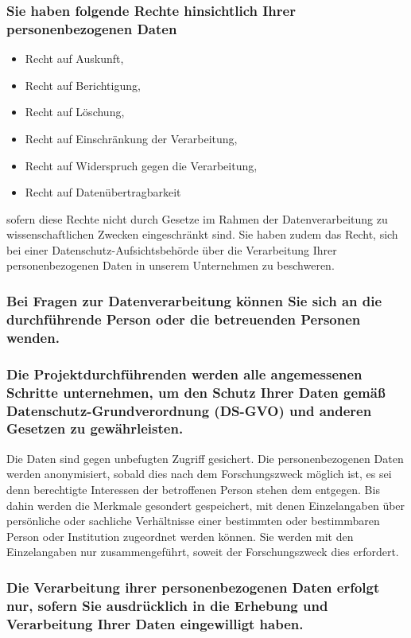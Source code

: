 \documentclass[11pt,a4paper]{article}
\begin{document}
\subsubsection{Sie haben folgende Rechte hinsichtlich Ihrer personenbezogenen Daten}

\begin{itemize}
\item Recht auf Auskunft,
\item Recht auf Berichtigung,
\item Recht auf Löschung,
\item Recht auf Einschränkung der Verarbeitung,
\item Recht auf Widerspruch gegen die Verarbeitung,
\item Recht auf Datenübertragbarkeit
\end{itemize}

sofern diese Rechte nicht durch Gesetze im Rahmen der Datenverarbeitung zu wissenschaftlichen Zwecken eingeschränkt sind.
Sie haben zudem das Recht, sich bei einer Datenschutz-Aufsichtsbehörde über die Verarbeitung Ihrer personenbezogenen Daten in unserem Unternehmen zu beschweren.

\subsubsection{Bei Fragen zur Datenverarbeitung können Sie sich an die durchführende Person oder die betreuenden Personen wenden.}

\subsubsection{Die Projektdurchführenden werden alle angemessenen Schritte unternehmen, um den Schutz Ihrer Daten gemäß Datenschutz-Grundverordnung (DS-GVO) und anderen Gesetzen zu gewährleisten.}
Die Daten sind gegen unbefugten Zugriff gesichert.
Die personenbezogenen Daten werden anonymisiert, sobald dies nach dem Forschungszweck möglich ist, es sei denn berechtigte Interessen der betroffenen Person stehen dem entgegen.
Bis dahin werden die Merkmale gesondert gespeichert, mit denen Einzelangaben über persönliche oder sachliche Verhältnisse einer bestimmten oder bestimmbaren Person oder Institution zugeordnet werden können.
Sie werden mit den Einzelangaben nur zusammengeführt, soweit der Forschungszweck dies erfordert.

\subsubsection{Die Verarbeitung ihrer personenbezogenen Daten erfolgt nur, sofern Sie ausdrücklich in die Erhebung und Verarbeitung Ihrer Daten eingewilligt haben.}
\end{document}
